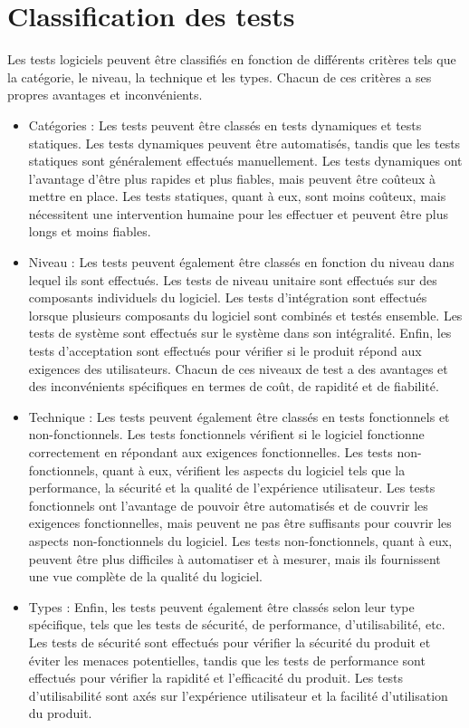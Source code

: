\section{Classification des tests}
\label{sec:classification}
Les tests logiciels peuvent être classifiés en fonction de différents critères tels que la catégorie, le niveau, la technique et les types. Chacun de ces critères a ses propres avantages et inconvénients.
\begin{itemize}
\item Catégories :
Les tests peuvent être classés en tests dynamiques et tests statiques. Les tests dynamiques peuvent être automatisés, tandis que les tests statiques sont généralement effectués manuellement. Les tests dynamiques ont l'avantage d'être plus rapides et plus fiables, mais peuvent être coûteux à mettre en place. Les tests statiques, quant à eux, sont moins coûteux, mais nécessitent une intervention humaine pour les effectuer et peuvent être plus longs et moins fiables.

\item Niveau :
Les tests peuvent également être classés en fonction du niveau dans lequel ils sont effectués. Les tests de niveau unitaire sont effectués sur des composants individuels du logiciel. Les tests d'intégration sont effectués lorsque plusieurs composants du logiciel sont combinés et testés ensemble. Les tests de système sont effectués sur le système dans son intégralité. Enfin, les tests d'acceptation sont effectués pour vérifier si le produit répond aux exigences des utilisateurs. Chacun de ces niveaux de test a des avantages et des inconvénients spécifiques en termes de coût, de rapidité et de fiabilité.\parencite{SoftwareQualityEngineering}

\item Technique :
Les tests peuvent également être classés en tests fonctionnels et non-fonctionnels. Les tests fonctionnels vérifient si le logiciel fonctionne correctement en répondant aux exigences fonctionnelles. Les tests non-fonctionnels, quant à eux, vérifient les aspects du logiciel tels que la performance, la sécurité et la qualité de l'expérience utilisateur. Les tests fonctionnels ont l'avantage de pouvoir être automatisés et de couvrir les exigences fonctionnelles, mais peuvent ne pas être suffisants pour couvrir les aspects non-fonctionnels du logiciel. Les tests non-fonctionnels, quant à eux, peuvent être plus difficiles à automatiser et à mesurer, mais ils fournissent une vue complète de la qualité du logiciel.

\item Types : Enfin, les tests peuvent également être classés selon leur type spécifique, tels que les tests de sécurité, de performance, d'utilisabilité, etc. Les tests de sécurité sont effectués pour vérifier la sécurité du produit et éviter les menaces potentielles, tandis que les tests de performance sont effectués pour vérifier la rapidité et l'efficacité du produit. Les tests d'utilisabilité sont axés sur l'expérience utilisateur et la facilité d'utilisation du produit.
\end{itemize}




